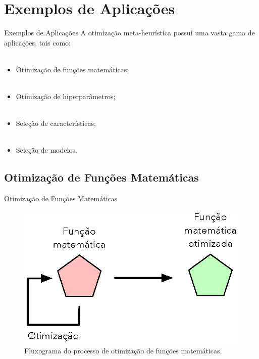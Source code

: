\section{Exemplos de Aplicações}
\label{s.applications}

\begin{frame}{Exemplos de Aplicações}
	A otimização meta-heurística possui uma vasta gama de aplicações, tais como:
	\\~\\
	\begin{itemize}
		\justifying
		\item Otimização de funções matemáticas;
		\\~\\
		\item Otimização de hiperparâmetros;
		\\~\\
		\item Seleção de características;
		\\~\\
		\item \sout{Seleção de modelos}.
	\end{itemize}

\end{frame}

\subsection{Otimização de Funções Matemáticas}
\label{ss.applications_benchmark}

\begin{frame}{Otimização de Funções Matemáticas}
	\begin{figure}
		\centering
		\includegraphics[scale=0.7]{figs/benchmark_opt.eps}	
		\caption{Fluxograma do processo de otimização de funções matemáticas.}
		\label{f.benchmark_opt}
	\end{figure}
\end{frame}

